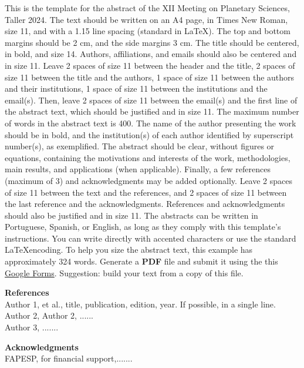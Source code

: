 \documentclass[11pt,english]{article}
\begin{document}
This is the template for the abstract of the XII Meeting on Planetary Sciences, Taller 2024. The text should be written on an A4 page, in Times New Roman, size 11, and with a 1.15 line spacing (standard in \LaTeX). The top and bottom margins should be 2 cm, and the side margins 3 cm. The title should be centered, in bold, and size 14. Authors, affiliations, and emails should also be centered and in size 11. Leave 2 spaces of size 11 between the header and the title, 2 spaces of size 11 between the title and the authors, 1 space of size 11 between the authors and their institutions, 1 space of size 11 between the institutions and the email(s). Then, leave 2 spaces of size 11 between the email(s) and the first line of the abstract text, which should be justified and in size 11. The maximum number of words in the abstract text is 400. The name of the author presenting the work should be in bold, and the institution(s) of each author identified by superscript number(s), as exemplified. The abstract should be clear, without figures or equations, containing the motivations and interests of the work, methodologies, main results, and applications (when applicable). Finally, a few references (maximum of 3) and acknowledgments may be added optionally. Leave 2 spaces of size 11 between the text and the references, and 2 spaces of size 11 between the last reference and the acknowledgments. References and acknowledgments should also be justified and in size 11. The abstracts can be written in Portuguese, Spanish, or English, as long as they comply with this template's instructions. You can write directly with accented characters or use the standard \LaTeX encoding. To help you size the abstract text, this example has approximately 324 words. Generate a \textbf{PDF} file and submit it using the this \href{https://docs.google.com/forms/d/e/1FAIpQLSe3LNkrxN4aOT4ggDMunIProp0scS8lvvUr3rAAwxEhrXiSGQ/viewform}{Google Forms}. Suggestion: build your text from a copy of this file.
\vspace{0.8cm}

{\bf References}\\
Author 1, et al., title, publication, edition, year. If possible, in a single line.\\
Author 2, Author 2, ......\\
Author 3, .......
\vspace{0.8cm}

{\bf Acknowledgments}\\
FAPESP, for financial support,.......
\end{document}
